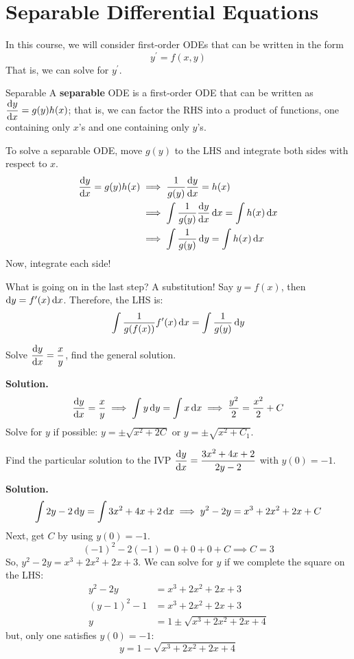 \section{Separable Differential Equations}
In this course, we will consider first-order ODEs that can be written
in the form
\[ y^\prime=f(x,y) \]
That is, we can solve for $ y^\prime $.

\begin{Definition}{Separable}{}
    A \textbf{separable} ODE is a first-order ODE that can be written as
    $ \displaystyle  \odv{y}{x} =g(y)h(x) $;
    that is, we can factor the RHS into a product of functions, one containing
    only $ x $'s and one containing only $ y $'s.
\end{Definition}
To solve a separable ODE, move $ g(y) $ to the LHS and integrate both sides with respect
to $ x $.
\begin{align*}
    \odv{y}{x} =g(y)h(x)
     & \implies \frac{1}{g(y)}\odv{y}{x} =h(x)                            \\
     & \implies \int \frac{1}{g(y)}\odv{y}{x} \odif{x} =\int h(x)\odif{x} \\
     & \implies \int \frac{1}{g(y)} \odif{y} =\int h(x)\odif{x}           \\
\end{align*}
Now, integrate each side!
\begin{Remark}{}{}
    What is going on in the last step? A substitution! Say $ y=f(x) $,
    then $ \odif{y}=f^\prime(x)\odif{x} $. Therefore, the LHS is:
    \[ \int \frac{1}{g(f(x))} f^\prime(x)\odif{x} =\int \frac{1}{g(y)} \odif{y} \]
\end{Remark}

\begin{Example}{}{}
    Solve
    $ \displaystyle \odv{y}{x} =\frac{x}{y} $,
    find the general solution.

    \textbf{Solution.}
    \[
        \odv{y}{x} =\frac{x}{y}
        \implies \int y\odif{y} =\int x\odif{x}
        \implies \frac{y^2}{2} =\frac{x^2}{2}+C
    \]
    Solve for $ y $ if possible: $ y=\pm\sqrt{x^2+2C} $ or $ y=\pm\sqrt{x^2+C_1} $.
\end{Example}

\begin{Example}{}{}
    Find the particular solution to the IVP
    $ \displaystyle  \odv{y}{x}=\frac{3x^2+4x+2}{2y-2} $
    with $ y(0)=-1 $.

    \textbf{Solution.}
    \[ \int 2y-2\odif{y} =\int 3x^2+4x+2\odif{x} \implies y^2-2y=x^3+2x^2+2x+C \]
    Next, get $ C $ by using $ y(0)=-1 $.
    \[ (-1)^2-2(-1)=0+0+0+C\implies C=3 \]
    So, $ y^2-2y=x^3+2x^2+2x+3 $. We can solve for $ y $ if we complete the square
    on the LHS\@:
    \begin{align*}
        y^2-2y    & =  x^3+2x^2+2x+3           \\
        (y-1)^2-1 & = x^3+2x^2+2x+3            \\
        y         & = 1\pm\sqrt{x^3+2x^2+2x+4}
    \end{align*}
    but, only one satisfies $ y(0)=-1 $:
    \[ y=1-\sqrt{x^3+2x^2+2x+4} \]
\end{Example}

